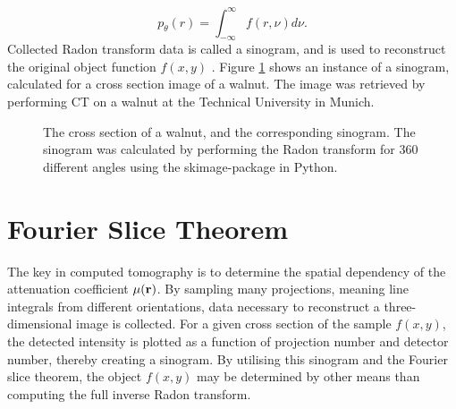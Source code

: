 \begin{equation}\label{eq:Radon_transform}
    p_{\theta}(r) = \int_{-\infty}^{\infty} f(r,\nu) d\nu.
\end{equation}
Collected Radon transform data is called a sinogram, and is used to reconstruct the original object function $f(x,y)$ \cite{gonzalez2018digital}.
Figure \ref{fig:Radon_transform} shows an instance of a sinogram, calculated for a cross section image of a walnut.
The image was retrieved by performing CT on a walnut at the Technical University in Munich.
\begin{figure}[h!]
    \centering
    
    \caption[Example of Sinogram]{The cross section of a walnut, and the corresponding sinogram.
        The sinogram was calculated by performing the Radon transform for 360 different angles using the skimage-package in Python. }
    \label{fig:Radon_transform}
\end{figure}


\section{Fourier Slice Theorem}
The key in computed tomography is to determine the spatial dependency of the attenuation coefficient $\mu(\bm{\mathrm{r}})$.
By sampling many projections, meaning line integrals from different orientations, data necessary to reconstruct a three-dimensional image is collected.
For a given cross section of the sample $f(x, y)$, the detected intensity is plotted as a function of projection number and detector number, thereby creating a sinogram.
By utilising this sinogram and the Fourier slice theorem, the object $f(x, y)$ may be determined by other means than computing the full inverse Radon transform.

